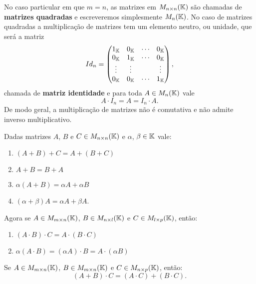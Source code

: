 No caso particular em que $m = n$, as matrizes em $M_{n\times n}(\mathbb{K})$ s\~ao chamadas de \textbf{matrizes quadradas} e escreveremos simplesmente $M_n(\mathbb{K})$. No caso de matrizes quadradas a multiplica\c{c}\~ao de matrizes tem um elemento neutro, ou unidade, que ser\'a a matriz
\[
	Id_n = \begin{pmatrix}
		1_{\mathbb{K}} & 0_{\mathbb{K}} & \cdots & 0_{\mathbb{K}}\\
		0_{\mathbb{K}} & 1_{\mathbb{K}} & \cdots & 0_{\mathbb{K}}\\
		\vdots & \vdots & & \vdots\\
		0_{\mathbb{K}} & 0_{\mathbb{K}} & \cdots & 1_{\mathbb{K}}
	\end{pmatrix},
\]
chamada de \textbf{matriz identidade} e para toda $A \in M_n(\mathbb{K})$ vale
\[
	A\cdot I_n = A = I_n\cdot A.
\]
De modo geral, a multiplica\c{c}\~ao de matrizes n\~ao \'e comutativa e n\~ao admite inverso multiplicativo.

\begin{proposicao}
	Dadas matrizes $A$, $B$ e $C \in M_{n\times n}(\mathbb{K})$ e $\alpha$, $\beta \in \mathbb{K}$ vale:
	\begin{enumerate}[label={\roman*})]
		\item $(A + B) + C = A + (B + C)$
		\item $A + B = B + A$
		\item $\alpha(A + B) = \alpha A + \alpha B$
		\item $(\alpha + \beta)A = \alpha A + \beta A$.
	\end{enumerate}
	Agora se $A \in M_{m\times n}(\mathbb{K})$, $B \in M_{n\times l}(\mathbb{K})$ e $C \in M_{l\times p}(\mathbb{K})$, ent\~ao:
	\begin{enumerate}[label={\roman*})]
		\item $(A\cdot B)\cdot C = A\cdot(B \cdot C)$
		\item $\alpha(A\cdot B) = (\alpha A)\cdot B = A \cdot(\alpha B)$
	\end{enumerate}
	Se $A \in M_{m\times n}(\mathbb{K})$, $B \in M_{m\times n}(\mathbb{K})$ e $C \in M_{n\times p}(\mathbb{K})$, ent\~ao:
	\[
		(A + B)\cdot C = (A\cdot C) + (B\cdot C).
	\]
\end{proposicao}
